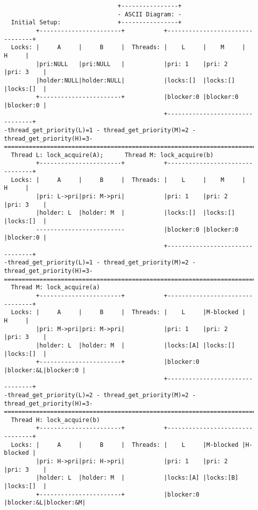 \documentclass[a4wide, 11pt]{article}
\begin{document}
\begin{verbatim}
                                +----------------+
                                - ASCII Diagram: -
  Initial Setup:                +----------------+
         +-----------------------+           +--------------------------------+
  Locks: |     A     |     B     |  Threads: |    L     |    M     |    H     |
         |pri:NULL   |pri:NULL   |           |pri: 1    |pri: 2    |pri: 3    |
         |holder:NULL|holder:NULL|           |locks:[]  |locks:[]  |locks:[]  |
         +-----------------------+           |blocker:0 |blocker:0 |blocker:0 |
                                             +--------------------------------+
-thread_get_priority(L)=1 - thread_get_priority(M)=2 - thread_get_priority(H)=3-
================================================================================
  Thread L: lock_acquire(A);      Thread M: lock_acquire(b) 
         +-----------------------+           +--------------------------------+
  Locks: |     A     |     B     |  Threads: |    L     |    M     |    H     |
         |pri: L->pri|pri: M->pri|           |pri: 1    |pri: 2    |pri: 3    |
         |holder: L  |holder: M  |           |locks:[]  |locks:[]  |locks:[]  |
         -------------------------           |blocker:0 |blocker:0 |blocker:0 |
                                             +--------------------------------+
-thread_get_priority(L)=1 - thread_get_priority(M)=2 - thread_get_priority(H)=3-
================================================================================
  Thread M: lock_acquire(a) 
         +-----------------------+           +--------------------------------+
  Locks: |     A     |     B     |  Threads: |    L     |M-blocked |    H     |
         |pri: M->pri|pri: M->pri|           |pri: 1    |pri: 2    |pri: 3    |
         |holder: L  |holder: M  |           |locks:[A] |locks:[]  |locks:[]  |
         +-----------------------+           |blocker:0 |blocker:&L|blocker:0 |
                                             +--------------------------------+
-thread_get_priority(L)=2 - thread_get_priority(M)=2 - thread_get_priority(H)=3-
================================================================================
  Thread H: lock_acquire(b)
         +-----------------------+           +--------------------------------+
  Locks: |     A     |     B     |  Threads: |    L     |M-blocked |H-blocked |
         |pri: H->pri|pri: H->pri|           |pri: 1    |pri: 2    |pri: 3    |
         |holder: L  |holder: M  |           |locks:[A] |locks:[B] |locks:[]  |
         +-----------------------+           |blocker:0 |blocker:&L|blocker:&M|

\end{verbatim}
\end{document}
